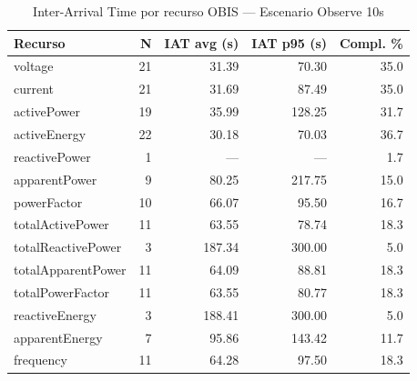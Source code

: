 %

\begin{table}[htbp]
\centering
\caption{Inter-Arrival Time por recurso OBIS — Escenario Observe 10s}
\label{tab:iat-per-key-10s}
\begin{tabular}{lrrrr}
\toprule
\textbf{Recurso} & \textbf{N} & \textbf{IAT avg (s)} & \textbf{IAT p95 (s)} & \textbf{Compl. \%} \\
\midrule
voltage & 21 & 31.39 & 70.30 & 35.0 \\
current & 21 & 31.69 & 87.49 & 35.0 \\
activePower & 19 & 35.99 & 128.25 & 31.7 \\
activeEnergy & 22 & 30.18 & 70.03 & 36.7 \\
reactivePower & 1 & --- & --- & 1.7 \\
apparentPower & 9 & 80.25 & 217.75 & 15.0 \\
powerFactor & 10 & 66.07 & 95.50 & 16.7 \\
totalActivePower & 11 & 63.55 & 78.74 & 18.3 \\
totalReactivePower & 3 & 187.34 & 300.00 & 5.0 \\
totalApparentPower & 11 & 64.09 & 88.81 & 18.3 \\
totalPowerFactor & 11 & 63.55 & 80.77 & 18.3 \\
reactiveEnergy & 3 & 188.41 & 300.00 & 5.0 \\
apparentEnergy & 7 & 95.86 & 143.42 & 11.7 \\
frequency & 11 & 64.28 & 97.50 & 18.3 \\
\bottomrule
\end{tabular}
\end{table}
